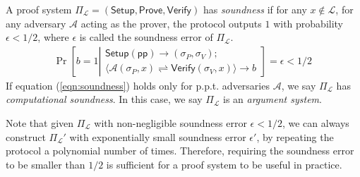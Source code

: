 \documentclass[acmtog]{acmart}
\newcommand{\cA}{\mathcal{A}}
\newcommand{\cL}{\mathcal{L}}
\newcommand{\Setup}{\mathsf{Setup}}
\newcommand{\Prove}{\mathsf{Prove}}
\newcommand{\Verify}{\mathsf{Verify}}
\newcommand{\pp}{\mathsf{pp}}
\newcommand{\PiL}{\Pi_{\cL}}
\begin{document}
\begin{definition}[Soundness]
\label{def:soundness}
	A proof system $\PiL=(\Setup,\Prove,\Verify)$ has \emph{soundness} if for any $x\notin\cL$, for any adversary $\cA$ acting as the prover, the protocol outputs $1$ with probability $\epsilon < 1/2$, where $\epsilon$ is called the soundness error of $\PiL$.
	\begin{eqnarray}
	\label{eqn:soundness}
	\Pr\left[b=1\left|
	\begin{matrix}
	\Setup(\pp)\to(\sigma_P,\sigma_V);\\
	\langle\cA(\sigma_P, x)\rightleftharpoons\Verify(\sigma_V, x)\rangle\to b
	\end{matrix}
	\right.\right]=\epsilon < 1/2\,
	\end{eqnarray}
	If equation (\ref{eqn:soundness}) holds only for p.p.t. adversaries $\cA$, we say $\PiL$ has \emph{computational soundness}.
	In this case, we say $\PiL$ is an \emph{argument system}.
\end{definition}

Note that given $\PiL$ with non-negligible soundness error $\epsilon < 1/2$, we can always construct $\PiL'$ with exponentially small soundness error $\epsilon'$, by repeating the protocol a polynomial number of times.
Therefore, requiring the soundness error to be smaller than $1/2$ is sufficient for a proof system to be useful in practice.
\end{document}
